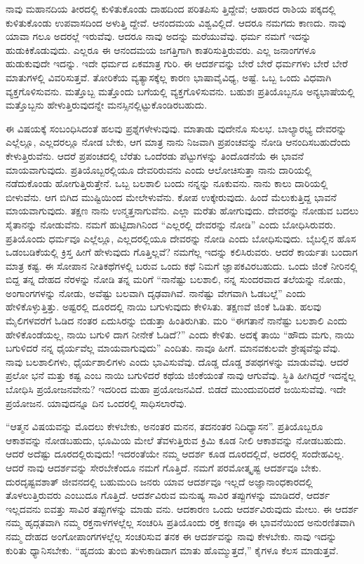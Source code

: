 ನಾವು ಮಹಾನದಿಯ ತೀರದಲ್ಲಿ ಕುಳಿತುಕೊಂಡು ದಾಹದಿಂದ ಪರಿತಪಿಸು ತ್ತಿದ್ದೇವೆ; ಆಹಾರದ ರಾಶಿಯ ಪಕ್ಕದಲ್ಲಿ ಕುಳಿತುಕೊಂಡು ಉಪವಾಸದಿಂದ ಅಳುತ್ತಿ ದ್ದೇವೆ. ಆನಂದಮಯ ವಿಶ್ವವಿಲ್ಲಿದೆ. ಆದರೂ ನಮಗದು ಕಾಣದು. ನಾವು ಯಾವಾ ಗಲೂ ಅದರಲ್ಲೆ ಇರುವೆವು. ಆದರೂ ನಾವು ಅದನ್ನು ಮರೆಯುವೆವು. ಧರ್ಮ ನಮಗೆ ಇದನ್ನು ಹುಡುಕಿಕೊಡುವುದು. ಎಲ್ಲರೂ ಈ ಆನಂದಮಯ ಜಗತ್ತಿಗಾಗಿ ಕಾತರಿಸುತ್ತಿರುವರು. ಎಲ್ಲ ಜನಾಂಗಗಳೂ ಹುಡುಕುವುದೇ ಇದನ್ನು. ಇದೇ ಧರ್ಮದ ಏಕಮಾತ್ರ ಗುರಿ. ಈ ಆದರ್ಶವನ್ನು ಬೇರೆ ಬೇರೆ ಧರ್ಮಗಳು ಬೇರೆ ಬೇರೆ ಮಾತುಗಳಲ್ಲಿ ವಿವರಿಸುತ್ತವೆ. ತೋರಿಕೆಯ ವ್ಯತ್ಯಾಸಕ್ಕೆಲ್ಲ ಕಾರಣ ಭಾಷಾವೈವಿಧ್ಯ, ಅಷ್ಟೆ. ಒಬ್ಬ ಒಂದು ವಿಧವಾಗಿ ವ್ಯಕ್ತಗೊಳಿಸುವನು. ಮತ್ತೊಬ್ಬ ಮತ್ತೊಂದು ಬಗೆಯಲ್ಲಿ ವ್ಯಕ್ತಗೊಳಿಸುವನು. ಬಹುಶಃ ಪ್ರತಿಯೊಬ್ಬನೂ ಅನ್ಯಭಾಷೆಯಲ್ಲಿ ಮತ್ತೊಬ್ಬನು ಹೇಳುತ್ತಿರುವುದನ್ನೇ ಮನಸ್ಸಿನಲ್ಲಿಟ್ಟುಕೊಂಡಿರಬಹುದು.

ಈ ವಿಷಯಕ್ಕೆ ಸಂಬಂಧಿಸಿದಂತೆ ಹಲವು ಪ್ರಶ್ನೆಗಳೇಳುವುವು. ಮಾತಾಡು ವುದೇನೊ ಸುಲಭ. ಬಾಲ್ಯಾರಭ್ಯ ದೇವರನ್ನು ಎಲ್ಲೆಲ್ಲೂ, ಎಲ್ಲದರಲ್ಲೂ ನೋಡ ಬೇಕು, ಆಗ ಮಾತ್ರ ನಾನು ನಿಜವಾಗಿ ಪ್ರಪಂಚವನ್ನು ನೋಡಿ ಆನಂದಿಸಬಹುದೆಂದು ಕೇಳುತ್ತಿರುವೆನು. ಆದರೆ ಪ್ರಪಂಚದಲ್ಲಿ ಬೆರೆತು ಒಂದೆರಡು ಪೆಟ್ಟುಗಳನ್ನು ತಿಂದೊಡನೆಯೆ ಈ ಭಾವನೆ ಮಾಯವಾಗುವುದು. ಪ್ರತಿಯೊಬ್ಬರಲ್ಲಿಯೂ ದೇವರಿರುವನು ಎಂದು ಆಲೋಚಿಸುತ್ತಾ ನಾನು ದಾರಿಯಲ್ಲಿ ನಡೆದುಕೊಂಡು ಹೋಗುತ್ತಿರುತ್ತೇನೆ. ಒಬ್ಬ ಬಲಶಾಲಿ ಬಂದು ನನ್ನನ್ನು ನೂಕುವನು. ನಾನು ಕಾಲು ದಾರಿಯಲ್ಲಿ ಬೀಳುವೆನು. ಆಗ ಬಿಗಿದ ಮುಷ್ಟಿಯಿಂದ ಮೇಲೇಳುವೆನು. ಕೋಪ ಉಕ್ಕೇರುವುದು. ಹಿಂದೆ ಮೆಲುಕುತ್ತಿದ್ದ ಭಾವನೆ ಮಾಯವಾಗುವುದು. ತಕ್ಷಣ ನಾನು ಉನ್ಮತ್ತನಾಗುವೆನು. ಎಲ್ಲಾ ಮರೆತು ಹೋಗುವುದು. ದೇವರನ್ನು ನೋಡುವ ಬದಲು ಸೈತಾನನ್ನು ನೋಡುವೆನು. ನಮಗೆ ಹುಟ್ಟಿದಾಗಿನಿಂದ “ಎಲ್ಲರಲ್ಲಿ ದೇವರನ್ನು ನೋಡಿ” ಎಂದು ಬೋಧಿಸಿರುವರು. ಪ್ರತಿಯೊಂದು ಧರ್ಮವೂ ಎಲ್ಲೆಲ್ಲೂ, ಎಲ್ಲದರಲ್ಲಿಯೂ ದೇವರನ್ನು ನೋಡಿ ಎಂದು ಬೋಧಿಸುವುದು. ಬೈಬಲ್ಲಿನ ಹೊಸ ಒಡಂಬಡಿಕೆಯಲ್ಲಿ ಕ್ರಿಸ್ತ ಹೀಗೆ ಹೇಳುವುದು ಗೊತ್ತಿಲ್ಲವೆ? ನಮಗೆಲ್ಲ ಇದನ್ನು ಕಲಿಸಿರುವರು. ಆದರೆ ಕಾರ್ಯತಃ ಬಂದಾಗ ಮಾತ್ರ ಕಷ್ಟ. ಈ ಸೋಪಾನ ನೀತಿಕಥೆಗಳಲ್ಲಿ ಬರುವ ಒಂದು ಕಥೆ ನಿಮಗೆ ಜ್ಞಾಪಕವಿರಬಹುದು. ಒಂದು ಜಿಂಕೆ ನೀರಿನಲ್ಲಿ ಬಿದ್ದ ತನ್ನ ದೇಹದ ನೆರಳನ್ನು ನೋಡಿ ತನ್ನ ಮರಿಗೆ “ನಾನೆಷ್ಟು ಬಲಶಾಲಿ, ನನ್ನ ಸುಂದರವಾದ ತಲೆಯನ್ನು ನೋಡು, ಅಂಗಾಂಗಗಳನ್ನು ನೋಡು, ಅವೆಷ್ಟು ಬಲವಾಗಿ ದೃಢವಾಗಿವೆ. ನಾನೆಷ್ಟು ವೇಗವಾಗಿ ಓಡಬಲ್ಲೆ” ಎಂದು ಹೇಳಿಕೊಳ್ಳುತ್ತಿತ್ತು. ಅಷ್ಟರಲ್ಲಿ ದೂರದಲ್ಲಿ ನಾಯಿ ಬಗುಳುವುದು ಕೇಳಿಸಿತು. ತಕ್ಷಣವೆ ಜಿಂಕೆ ಓಡಿತು. ಹಲವು ಮೈಲಿಗಳವರೆಗೆ ಓಡಿದ ನಂತರ ಏದುಸಿರನ್ನು ಬಿಡುತ್ತಾ ಹಿಂತಿರುಗಿತು. ಮರಿ “ಈಗತಾನೆ ನಾನೆಷ್ಟು ಬಲಶಾಲಿ ಎಂದು ಹೇಳಿಕೊಂಡೆಯಲ್ಲ, ನಾಯಿ ಬಗುಳಿ ದಾಗ ನೀನೇಕೆ ಓಡಿದೆ?” ಎಂದು ಕೇಳಿತು. ಅದಕ್ಕೆ ತಾಯಿ “ಹೌದು ಮಗು, ನಾಯಿ ಬಗುಳಿದರೆ ನನ್ನ ಧೈರ್ಯವೆಲ್ಲ ಮಾಯವಾಗುವುದು” ಎಂದಿತು. ನಾವೂ ಹೀಗೆ. ಮಾನವಕುಲವೇ ಶ್ರೇಷ್ಠವೆನ್ನುವೆವು. ನಾವು ಬಲಶಾಲಿಗಳು, ಧೈರ್ಯಶಾಲಿಗಳು ಎಂದು ಭಾವಿಸುವೆವು. ದೊಡ್ಡ ದೊಡ್ಡ ಶಪಥಗಳನ್ನು ಮಾಡುವೆವು. ಆದರೆ ಪ್ರಲೋ ಭನೆ ಮತ್ತು ಕಷ್ಟ ಎಂಬ ನಾಯಿ ಬಗುಳಿದರೆ ಕಥೆಯ ಜಿಂಕೆಯಂತೆ ನಾವು ಆಗುವೆವು. ಸ್ಥಿತಿ ಹೀಗಿದ್ದರೆ ಇದನ್ನೆಲ್ಲ ಬೋಧಿಸಿ ಪ್ರಯೋಜನವೇನು? ಇದರಿಂದ ಮಹಾ ಪ್ರಯೋಜನವಿದೆ. ಬಿಡದೆ ಮುಂದುವರಿದರೆ ಜಯಿಸುವೆವು. ಇದೇ ಪ್ರಯೋಜನ. ಯಾವುದನ್ನೂ ದಿನ ಒಂದರಲ್ಲಿ ಸಾಧಿಸಲಾರೆವು.

“ಆತ್ಮನ ವಿಷಯವನ್ನು ಮೊದಲು ಕೇಳಬೇಕು, ಅನಂತರ ಮನನ, ತದನಂತರ ನಿದಿಧ್ಯಾಸನ”. ಪ್ರತಿಯೊಬ್ಬರೂ ಆಕಾಶವನ್ನು ನೋಡಬಹುದು, ಭೂಮಿಯ ಮೇಲೆ ತೆವಳುತ್ತಿರುವ ಕ್ರಿಮಿ ಕೂಡ ನೀಲಿ ಆಕಾಶವನ್ನು ನೋಡಬಹುದು. ಆದರೆ ಅದೆಷ್ಟು ದೂರದಲ್ಲಿರುವುದು! ಇದರಂತೆಯೇ ನಮ್ಮ ಆದರ್ಶ ಕೂಡ ದೂರದಲ್ಲಿದೆ, ಅದರಲ್ಲಿ ಸಂದೇಹವಿಲ್ಲ. ಆದರೆ ನಾವು ಆದರ್ಶವನ್ನು ಸೇರಬೇಕೆಂದೂ ನಮಗೆ ಗೊತ್ತಿದೆ. ನಮಗೆ ಪರಮೋತ್ಕೃಷ್ಟ ಆದರ್ಶವೂ ಬೇಕು. ದುರದೃಷ್ಟವಶಾತ್​ ಜೀವನದಲ್ಲಿ ಬಹುಮಂದಿ ಜನರು ಯಾವ ಆದರ್ಶವೂ ಇಲ್ಲದೆ ಅಜ್ಞಾನಾಂಧಕಾರದಲ್ಲಿ ತೊಳಲುತ್ತಿರುವರು ಎಂಬುದೂ ಗೊತ್ತಿದೆ. ಆದರ್ಶವಿರುವ ಮನುಷ್ಯ ಸಾವಿರ ತಪ್ಪುಗಳನ್ನು ಮಾಡಿದರೆ, ಆದರ್ಶ ಇಲ್ಲದವನು ಐವತ್ತು ಸಾವಿರ ತಪ್ಪುಗಳನ್ನು ಮಾಡು ವನು. ಆದಕಾರಣ ಒಂದು ಆದರ್ಶವಿರುವುದು ಮೇಲು. ಈ ಆದರ್ಶ ನಮ್ಮ ಹೃದ್ಗತವಾಗಿ ನಮ್ಮ ರಕ್ತನಾಳಗಳಲ್ಲೆಲ್ಲ ಸಂಚರಿಸಿ ಪ್ರತಿಯೊಂದು ರಕ್ತ ಕಣವೂ ಈ ಭಾವನೆಯಿಂದ ಅನುರಣಿತವಾಗಿ ನಮ್ಮ ದೇಹದ ಅಂಗೋಪಾಂಗಗಳಲ್ಲೆಲ್ಲ ಸಂಚರಿಸುವ ತನಕ ಈ ಆದರ್ಶವನ್ನು ನಾವು ಕೇಳಬೇಕು. ನಾವು ಇದನ್ನು ಕುರಿತು ಧ್ಯಾನಿಸಬೇಕು. “ಹೃದಯ ತುಂಬಿ ತುಳುಕಾಡಿದಾಗ ಮಾತು ಹೊಮ್ಮುತ್ತದೆ,” ಕೈಗಳೂ ಕೆಲಸ ಮಾಡುತ್ತವೆ.

